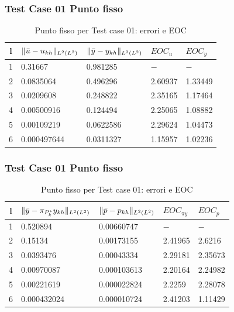 \documentclass{beamer}
\theoremstyle{definition}
\theoremstyle{remark}
\theoremstyle{plain}
\theoremstyle{definition}
\DeclarePairedDelimiter{\norma}{\lVert}{\rVert}
\begin{document}
\begin{frame}
\frametitle{Test Case 01 Punto fisso}
\begin{table}
\caption{Punto fisso per Test case 01: errori e EOC }
\label{puntofissoI}
\centering

\begin{tabular}{cllll}
\toprule
{l}           &  {$ \norma{\bar{u}-u_{kh}}_{L^2(L^2)} $} &  {$ \norma{\bar{y}-y_{kh}}_{L^2(L^2)} $} &  {$ EOC_u $} &  {$ EOC_y $} \\
\midrule
1            &  0.31667 &  0.981285 &  {$-$} &  {$-$} \\
2            &  0.0835064 &  0.496296 &  2.60937 &  1.33449 \\
3            &  0.0209608 &  0.248822 &  2.35165 &  1.17464 \\
4            &  0.00500916 &  0.124494 &  2.25065 &  1.08882 \\
5            &  0.00109219  &  0.0622586 &  2.29624 &  1.04473 \\
6            &  0.000497644 &  0.0311327 &  1.15957 &  1.02236 \\
\bottomrule
\end{tabular}              
\end{table}

\end{frame}

\begin{frame}
\frametitle{Test Case 01 Punto fisso}

\begin{table}
\caption{Punto fisso per Test case 01: errori e EOC }
\label{puntofissoIbis}
\centering

\begin{tabular}{cllll}
\toprule
{l}           &  {$ \norma{\bar{y}-\pi_{P^*_k}y_{kh}}_{L^2(L^2)} $} &  {$ \norma{\bar{p}-p_{kh}}_{L^2(L^2)} $} &  {$ EOC_{\pi y} $} &  {$ EOC_p $} \\
\midrule
1            &  0.520894 &  0.00660747 &  {$-$} &  {$-$} \\
2            &  0.15134 &  0.00173155 &  2.41965 &  2.6216 \\
3            &  0.0393476 &  0.00043334 &  2.29181 &  2.35673 \\
4            &  0.00970087 &  0.000103613 &  2.20164 &  2.24982 \\
5            &  0.00221619 &  0.000022824 &  2.2259 &  2.28078 \\
6            &  0.000432024 &  0.000010724 &  2.41203 &  1.11429 \\
\bottomrule
\end{tabular}              
\end{table}

\end{frame}
\end{document}
